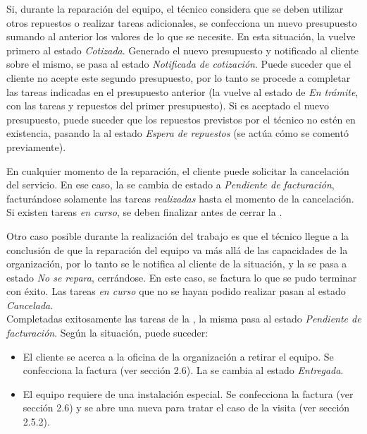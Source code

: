 \documentclass[12pt]{extarticle}
\begin{document}
\begin{spacing}{1.2}
    Si, durante la reparación del equipo, el técnico considera que se deben utilizar otros repuestos o realizar tareas adicionales, se confecciona un nuevo presupuesto sumando al anterior los valores de lo que se necesite. En esta situación, la \OT{} vuelve primero al estado \textit{Cotizada}. Generado el nuevo presupuesto y notificado al cliente sobre el mismo, se pasa al estado \textit{Notificada de cotización}. Puede suceder que el cliente no acepte este segundo presupuesto, por lo tanto se procede a completar las tareas indicadas en el presupuesto anterior (la \OT{} vuelve al estado de \textit{En trámite}, con las tareas y repuestos del primer presupuesto). Si es aceptado el nuevo presupuesto, puede suceder que los repuestos previstos por el técnico no estén en existencia, pasando la \OT{} al estado \textit{Espera de repuestos} (se actúa cómo se comentó previamente).
    
    En cualquier momento de la reparación, el cliente puede solicitar la cancelación del servicio. En ese caso, la \OT{} se cambia de estado a \textit{Pendiente de facturación}, facturándose solamente las tareas \textit{realizadas} hasta el momento de la cancelación. Si existen tareas \textit{en curso}, se deben finalizar antes de cerrar la \OT{}.
    
    Otro caso posible durante la realización del trabajo es que el técnico llegue a la conclusión de que la reparación del equipo va más allá de las capacidades de la organización, por lo tanto se le notifica al cliente de la situación, y la \OT{} se pasa a estado \textit{No se repara}, cerrándose. En este caso, se factura lo que se pudo terminar con éxito. Las tareas \textit{en curso} que no se hayan podido realizar pasan al estado \textit{Cancelada}.\\

    Completadas exitosamente las tareas de la \OT{}, la misma pasa al estado \textit{Pendiente de facturación}. Según la situación, puede suceder:
    \begin{itemize}
        \item El cliente se acerca a la oficina de la organización a retirar el equipo. Se confecciona la factura (ver sección 2.6). La \OT{} se cambia al estado \textit{Entregada}.
        \item El equipo requiere de una instalación especial. Se confecciona la factura (ver sección 2.6) y se abre una nueva \OT{} para tratar el caso de la visita (ver sección 2.5.2).
    \end{itemize}


\end{spacing}
\end{document}
